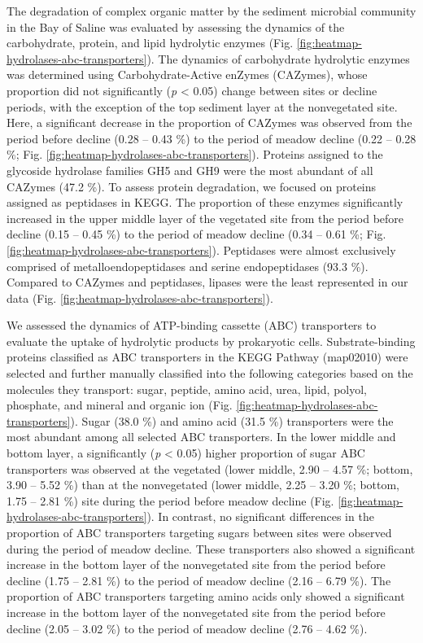 \documentclass[
  12 pt,
]{article}
\begin{document}
The degradation of complex organic matter by the sediment microbial community in the Bay of Saline was evaluated by assessing the dynamics of the carbohydrate, protein, and lipid hydrolytic enzymes (Fig. \ref{fig:heatmap-hydrolases-abc-transporters}). The dynamics of carbohydrate hydrolytic enzymes was determined using Carbohydrate-Active enZymes (CAZymes), whose proportion did not significantly (\emph{p} \textless{} 0.05) change between sites or decline periods, with the exception of the top sediment layer at the nonvegetated site. Here, a significant decrease in the proportion of CAZymes was observed from the period before decline (0.28 -- 0.43 \si{\percent}) to the period of meadow decline (0.22 -- 0.28 \si{\percent}; Fig. \ref{fig:heatmap-hydrolases-abc-transporters}). Proteins assigned to the glycoside hydrolase families GH5 and GH9 were the most abundant of all CAZymes (47.2 \si{\percent}). To assess protein degradation, we focused on proteins assigned as peptidases in KEGG. The proportion of these enzymes significantly increased in the upper middle layer of the vegetated site from the period before decline (0.15 -- 0.45 \si{\percent}) to the period of meadow decline (0.34 -- 0.61 \si{\percent}; Fig. \ref{fig:heatmap-hydrolases-abc-transporters}). Peptidases were almost exclusively comprised of metalloendopeptidases and serine endopeptidases (93.3 \si{\percent}). Compared to CAZymes and peptidases, lipases were the least represented in our data (Fig. \ref{fig:heatmap-hydrolases-abc-transporters}).

We assessed the dynamics of ATP-binding cassette (ABC) transporters to evaluate the uptake of hydrolytic products by prokaryotic cells. Substrate-binding proteins classified as ABC transporters in the KEGG Pathway (map02010) were selected and further manually classified into the following categories based on the molecules they transport: sugar, peptide, amino acid, urea, lipid, polyol, phosphate, and mineral and organic ion (Fig. \ref{fig:heatmap-hydrolases-abc-transporters}). Sugar (38.0 \si{\percent}) and amino acid (31.5 \si{\percent}) transporters were the most abundant among all selected ABC transporters. In the lower middle and bottom layer, a significantly (\emph{p} \textless{} 0.05) higher proportion of sugar ABC transporters was observed at the vegetated (lower middle, 2.90 -- 4.57 \si{\percent}; bottom, 3.90 -- 5.52 \si{\percent}) than at the nonvegetated (lower middle, 2.25 -- 3.20 \si{\percent}; bottom, 1.75 -- 2.81 \si{\percent}) site during the period before meadow decline (Fig. \ref{fig:heatmap-hydrolases-abc-transporters}). In contrast, no significant differences in the proportion of ABC transporters targeting sugars between sites were observed during the period of meadow decline. These transporters also showed a significant increase in the bottom layer of the nonvegetated site from the period before decline (1.75 -- 2.81 \si{\percent}) to the period of meadow decline (2.16 -- 6.79 \si{\percent}). The proportion of ABC transporters targeting amino acids only showed a significant increase in the bottom layer of the nonvegetated site from the period before decline (2.05 -- 3.02 \si{\percent}) to the period of meadow decline (2.76 -- 4.62 \si{\percent}).
\end{document}
